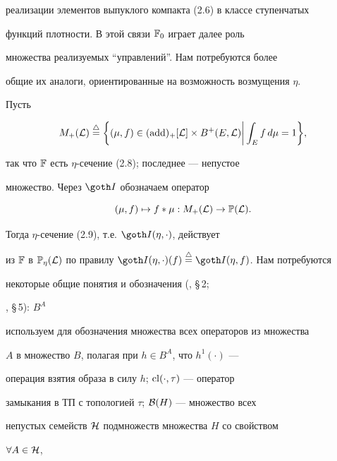 реализации элементов выпуклого компакта (2.6) в классе ступенчатых


функций плотности. В этой связи ${\Bbb F}_0$ играет далее роль


множества реализуемых ``управлений''. Нам потребуются более


общие их аналоги, ориентированные на возможность возмущения $\eta$.


Пусть


%


\begin{equation}


M_+({\cal L}) \stac \biggl\{\biggl.(\mu, f) \in \ad \times B^+\eL \biggr|


\int_E f\,d\mu = 1\biggr\},


\end{equation}


%


так что ${\Bbb F}$ есть $\eta$-сечение (2.8); последнее --- непустое


множество. Через ${\goth I}$ обозначаем оператор


%


\begin{equation}


(\mu, f) \mapsto f \ast \mu:  M_+({\cal L}) \to {\Bbb P}({\cal L}).


\end{equation}


%


Тогда $\eta$-сечение (2.9), т.е. ${\goth I}(\eta, \cdot)$, действует


из ${\Bbb F}$ в ${\Bbb P}_\eta({\cal L})$ по правилу ${\goth


I}(\eta, \cdot)(f) \stac {\goth I}(\eta, f)$. Нам потребуются


некоторые общие понятия и обозначения (\cite{Ch4}, \S\,2;


\cite{Ch5}, \S\,5): $B^A$


используем для обозначения множества всех операторов из множества


$A$ в множество $B$, полагая при $h \in B^A$, что $h^1(\cdot)$ ---


операция взятия образа в силу $h$; $\operatorname{cl}(\cdot, \tau)$ --- оператор


замыкания в ТП с топологией $\tau$; ${\cal B}(H)$ --- множество всех


непустых семейств ${\cal H}$ подмножеств множества $H$ со свойством


$\forall A \in {\cal H}$,


